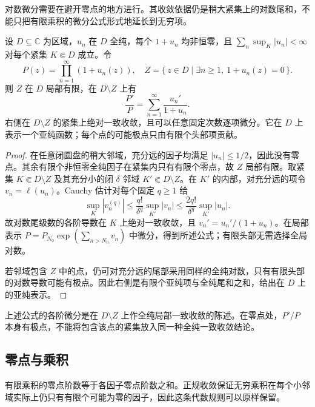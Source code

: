 \ProseParagraphBreak

对数微分需要在避开零点的地方进行。其收敛依据仍是稍大紧集上的对数尾和，不能只把有限乘积的微分公式形式地延长到无穷项。

\begin{proposition}[乘积的对数微分]\label{b3:prop:20-product-log-derivative}
设 \(D\subseteq\mathbb C\) 为区域，\(u_n\) 在 \(D\) 全纯，每个 \(1+u_n\) 均非恒零，且 \(\sum_n\sup_K|u_n|<\infty\) 对每个紧集 \(K\Subset D\) 成立。令
\[
 P(z)=\prod_{n=1}^{\infty}(1+u_n(z)),\quad
 Z=\{\,z\in D\mid \exists n\ge1,\ 1+u_n(z)=0\,\}.
\]
则 \(Z\) 在 \(D\) 局部有限，在 \(D\setminus Z\) 上有
\[
 \frac{P'}P=\sum_{n=1}^{\infty}\frac{u_n'}{1+u_n}.
\]
右侧在 \(D\setminus Z\) 的紧集上绝对一致收敛，且可以任意固定次数逐项微分。它在 \(D\) 上表示一个亚纯函数；每个点的可能极点只由有限个头部项贡献。
\end{proposition}
\begin{proof}
在任意闭圆盘的稍大邻域，充分远的因子均满足 \(|u_n|\le1/2\)，因此没有零点。其余有限个非恒零全纯因子在紧集内只有有限个零点，故 \(Z\) 局部有限。取紧集 \(K\Subset D\setminus Z\) 及其充分小的闭 \(\delta\) 邻域 \(K'\Subset D\setminus Z\)。在 \(K'\) 的内部，对充分远的项令 \(v_n=\ell(u_n)\)。Cauchy 估计对每个固定 \(q\ge1\) 给
\[
 \sup_K|v_n^{(q)}|
 \le\frac{q!}{\delta^q}\sup_{K'}|v_n|
 \le\frac{2q!}{\delta^q}\sup_{K'}|u_n|.
\]
故对数尾级数的各阶导数在 \(K\) 上绝对一致收敛，且 \(v_n'=u_n'/(1+u_n)\)。在局部表示 \(P=P_{N_0}\exp(\sum_{n>N_0}v_n)\) 中微分，得到所述公式；有限头部无需选择全局对数。

若邻域包含 \(Z\) 中的点，仍可对充分远的尾部采用同样的全纯对数，只有有限头部的对数导数可能有极点。因此右侧是有限个亚纯项与全纯尾和之和，给出在 \(D\) 上的亚纯表示。
\end{proof}
上述公式的各阶微分是在 \(D\setminus Z\) 上作全纯局部一致收敛的陈述。在零点处，\(P'/P\) 本身有极点，不能将包含该点的紧集放入同一种全纯一致收敛结论。

\subsection{零点与乘积}
\label{b3:subsec:200104}

有限乘积的零点阶数等于各因子零点阶数之和。正规收敛保证无穷乘积在每个小邻域实际上仍只有有限个可能为零的因子，因此这条代数规则可以原样保留。

